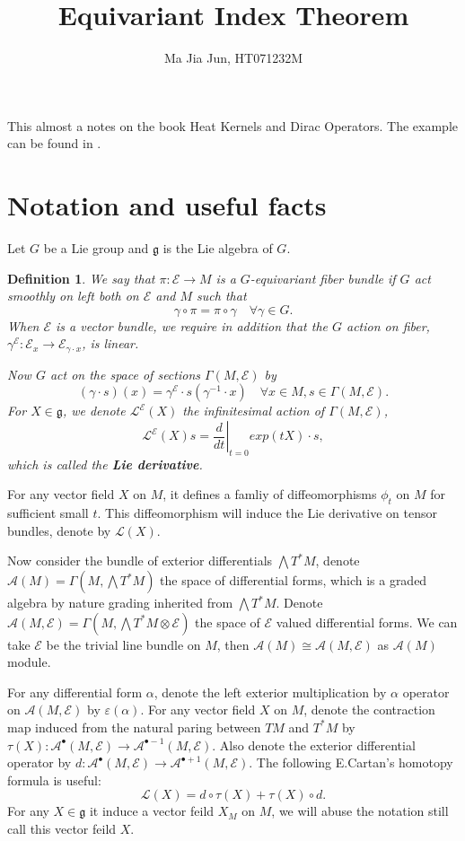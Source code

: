 \documentclass[12pt]{amsart}
\title{Equivariant Index Theorem}
\author{Ma Jia Jun, HT071232M}
\newtheorem{Def}[Thm]{Definition}
\def\cA{{\mathcal{A}}}
\def\cL{{\mathcal{L}}}
\def\cE{{\mathcal{E}}}
\def\fgg{{\mathfrak{g}}}
\def\kw#1{{\bf \em #1}}
\begin{document}
\maketitle

This almost a notes on the book Heat Kernels and Dirac Operators\cite{berline2004heat}. The example can be found in \cite{vergne1982representations}.

\section{Notation and useful facts}
Let $G$ be a Lie group and $\fgg$ is the Lie algebra of $G$.
\begin{Def}
We say that $\pi:\cE\to M$ is a  $G$-equivariant fiber bundle if $G$ act smoothly on left both on $\cE$ and $M$ such that 
\[
\gamma \circ \pi = \pi \circ \gamma \quad \forall \gamma\in G.
\]
When $\cE$ is a vector bundle, we require in addition that the $G$
action on fiber, $\gamma^\cE:\cE_x \to \cE_{\gamma\cdot x}$,  is linear.

Now $G$ act on the space of sections $\Gamma(M,\cE)$ by 
\[
(\gamma\cdot s)(x) = \gamma^\cE\cdot s(\gamma^{-1}\cdot x) \quad
\forall x\in M, s\in \Gamma(M,\cE). 
\]
For $X \in \fgg$, we denote $\cL^\cE(X)$ the infinitesimal action of
$\Gamma(M,\cE)$, 
\[
\cL^\cE(X) s =\left.\frac{d}{dt}\right|_{t=0} exp(tX)\cdot s,
\]
which is called the \kw{Lie derivative}.
\end{Def}
For any vector field $X$ on $M$, it defines a famliy of diffeomorphisms $\phi_t$
on $M$ for sufficient small $t$. This diffeomorphism will induce the
Lie derivative on tensor bundles, denote by $\cL(X)$. 

Now consider the bundle of exterior differentials $\bigwedge
T^*M$, denote $\cA(M)=\Gamma(M,\bigwedge T^*M)$  the space of
differential forms, which is a graded algebra by nature grading
inherited from $\bigwedge T^*M$.
Denote $\cA(M,\cE)=\Gamma(M,\bigwedge T^*M\otimes \cE)$  the space
of $\cE$ valued differential forms. We can take $\cE$ be the trivial
line bundle on $M$, then $\cA(M) \cong \cA(M,\cE)$ as $\cA(M)$ module.  

For any differential form $\alpha$, denote the
left exterior multiplication  by $\alpha$ operator on $\cA(M, \cE)$ by
$\varepsilon(\alpha)$.
For any vector field $X$ on $M$, denote the contraction map induced
from the natural paring between $TM$ and $T^*M$ by 
$\tau(X):\cA^\bullet(M,\cE)\to
\cA^{\bullet-1}(M,\cE)$. Also denote the exterior differential
operator by $d:\cA^\bullet(M,\cE) \to \cA^{\bullet+1}(M,\cE)$. The
  following E.Cartan's homotopy formula is useful:
\[
\cL(X) = d\circ \tau(X) + \tau(X)\circ d.
\]
For any $X\in \fgg$ it induce a vector feild $X_M$ on $M$, we will
abuse the notation still call this vector feild $X$.
\end{document}
